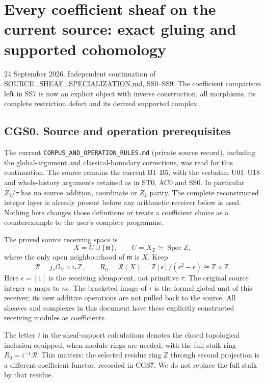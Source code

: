 \section{Every coefficient sheaf on the current source: exact gluing and
supported
cohomology}\label{every-coefficient-sheaf-on-the-current-source-exact-gluing-and-supported-cohomology}

24 September 2026. Independent continuation of
\url{SOURCE_SHEAF_SPECIALIZATION.md}, SS0--SS9. The coefficient
comparison left in SS7 is now an explicit object with inverse
construction, all morphisms, its complete restriction defect and its
derived supported complex.

\subsection{CGS0. Source and operation
prerequisites}\label{cgs0.-source-and-operation-prerequisites}

The current \nolinkurl{CORPUS_AND_OPERATION_RULES.md} (private source record), including the
global-argument and classical-boundary corrections, was read for this
continuation. The source remains the current B1--B5, with the verbatim
U01--U18 and whole-history arguments retained as in ST0, AC0 and SS0. In
particular \(Z_1/\tau\) has no source addition, coordinate or \(Z_2\)
parity. The complete reconstructed integer layer is already present
before any arithmetic receiver below is used. Nothing here changes those
definitions or treats a coefficient choice as a counterexample to the
user's complete programme.

The proved source receiving space is \[
 X=U\cup\{\mathfrak m\},\qquad U=X_{\mathbb Z}\simeq\operatorname{Spec}\mathbb Z,
\] where the only open neighbourhood of \(\mathfrak m\) is \(X\). Keep
\[
 \mathcal R=j_*\mathcal O_U\times i_*\mathbb Z,\qquad
 R_0=\mathcal R(X)=\mathbb Z[\epsilon]/(\epsilon^2-\epsilon)
 \cong\mathbb Z\times\mathbb Z .
\tag{CGS0.1}
\] Here \(\epsilon=[1]\) is the receiving idempotent, not primitive
\(\tau\). The original source integer \(n\) maps to \(n\epsilon\). The
bracketed image of \(\tau\) is the formal global unit of this receiver;
its new additive operations are not pulled back to the source. All
sheaves and complexes in this document have these explicitly constructed
receiving modules as coefficients.

The letter \(i\) in the sheaf-support calculations denotes the closed
topological inclusion equipped, when module rings are needed, with the
full stalk ring \(R_0=i^{-1}\mathcal R\). This matters: the selected
residue ring \(\mathbb Z\) through second projection is a different
coefficient functor, recorded in CGS7. We do not replace the full stalk
by that residue.

